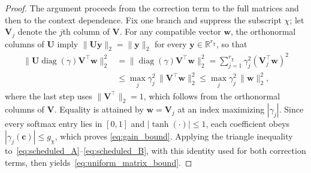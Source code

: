 \documentclass[journal]{IEEEtran}
\newcommand{\vc}{\mathbf{c}}
\newcommand{\mU}{\mathbf{U}}
\newcommand{\mV}{\mathbf{V}}
\newcommand{\R}{\mathbb{R}}
\newcommand{\norm}[2][]{\mathopen{#1\lVert}#2\mathclose{#1\rVert}}
\theoremstyle{plain}
\theoremstyle{definition}
\theoremstyle{definition}
\begin{document}
\begin{proof}
The argument proceeds from the correction term to the full matrices and
then to the context dependence. Fix one branch and suppress the
subscript $\chi$; let $\mV_j$ denote the $j$th column of $\mV$. For any
compatible vector $\mathbf w$, the orthonormal columns of $\mU$ imply
$\norm{\mU\mathbf y}_2=\norm{\mathbf y}_2$ for every
$\mathbf y\in\R^{r_\chi}$, so that
\begin{equation*}
\begin{aligned}
\norm{\mU\operatorname{diag}(\gamma)\mV^\top\mathbf w}_2^2
&=\norm{\operatorname{diag}(\gamma)\mV^\top\mathbf w}_2^2
=\sum_{j=1}^{r_\chi}\gamma_j^2(\mV_j^\top\mathbf w)^2\\
&\le\max_j\gamma_j^2\,\norm{\mV^\top\mathbf w}_2^2
\le\max_j\gamma_j^2\,\norm{\mathbf w}_2^2,
\end{aligned}
\end{equation*}
where the last step uses $\norm{\mV^\top}_2=1$, which follows from the
orthonormal columns of $\mV$.
Equality is attained by $\mathbf w=\mV_j$ at an index maximizing
$|\gamma_j|$. Since every softmax entry lies in $[0,1]$ and
$|\tanh(\cdot)|\le1$, each coefficient obeys
$|\gamma_j(\vc)|\le g_\chi$, which proves
\eqref{eq:gain_bound}. Applying the triangle inequality
to~\eqref{eq:scheduled_A}--\eqref{eq:scheduled_B}, with this identity
used for both correction terms, then
yields~\eqref{eq:uniform_matrix_bound}.


\end{proof}
\end{document}
